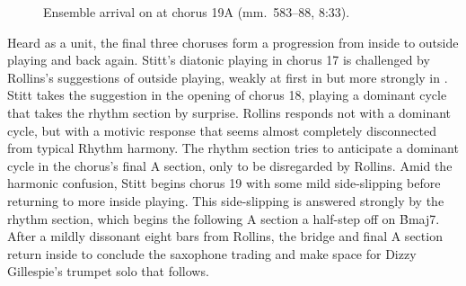 \begin{figure}[tbp]
  \caption[Ensemble arrival on \protect\h{Bmaj7} at chorus
  \protect{}.]{%
    Ensemble arrival on \protect{} at chorus
    {\protect\ssliningfont19A} (mm.~583--88, 8:33).}
  \label{et:ens-side-slipping}
\end{figure}

Heard as a unit, the final three choruses form a progression from inside to
outside playing and back again. Stitt's diatonic playing in chorus 17 is
challenged by Rollins's suggestions of outside playing, weakly at first in
 but more strongly in . Stitt takes the suggestion in
the opening of chorus 18, playing a dominant cycle that takes the rhythm
section by surprise. Rollins responds not with a dominant cycle, but with a
motivic response that seems almost completely disconnected from typical Rhythm
harmony. The rhythm section tries to anticipate a dominant cycle in the
chorus's final A section, only to be disregarded by Rollins. Amid the
harmonic confusion, Stitt begins chorus 19 with some mild side-slipping before
returning to more inside playing. This side-slipping is answered strongly by
the rhythm section, which begins the following A section a half-step off on
\h{Bmaj7}. After a mildly dissonant eight bars from Rollins, the bridge and
final A section return inside to conclude the saxophone trading and make space
for Dizzy Gillespie's trumpet solo that follows.

